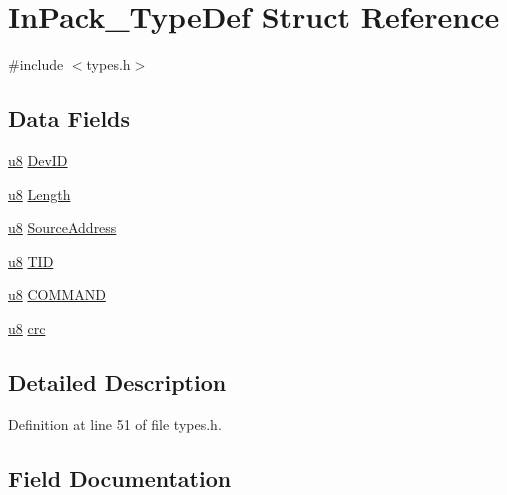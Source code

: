 \hypertarget{struct_in_pack___type_def}{}\section{In\+Pack\+\_\+\+Type\+Def Struct Reference}
\label{struct_in_pack___type_def}


{\ttfamily \#include $<$types.\+h$>$}

\subsection*{Data Fields}
\begin{DoxyCompactItemize}
\item 
\hyperlink{types_8h_aed742c436da53c1080638ce6ef7d13de}{u8} \hyperlink{struct_in_pack___type_def_a99d407767f1bfeb6b7e54c646df80472}{Dev\+I\+D}
\item 
\hyperlink{types_8h_aed742c436da53c1080638ce6ef7d13de}{u8} \hyperlink{struct_in_pack___type_def_ab74cd1c00143927f7c83f0c651dad173}{Length}
\item 
\hyperlink{types_8h_aed742c436da53c1080638ce6ef7d13de}{u8} \hyperlink{struct_in_pack___type_def_adf5bc4e40bad06fdd0c2b4e48f18831b}{Source\+Address}
\item 
\hyperlink{types_8h_aed742c436da53c1080638ce6ef7d13de}{u8} \hyperlink{struct_in_pack___type_def_ad1076cc9b9c0e86656584b48e443d884}{T\+I\+D}
\item 
\hyperlink{types_8h_aed742c436da53c1080638ce6ef7d13de}{u8} \hyperlink{struct_in_pack___type_def_ac58783f48ac7f67dcefd76e7a9c02de5}{C\+O\+M\+M\+A\+N\+D}
\item 
\hyperlink{types_8h_aed742c436da53c1080638ce6ef7d13de}{u8} \hyperlink{struct_in_pack___type_def_af3f2b259cd01019a9d79b1966a858470}{crc}
\end{DoxyCompactItemize}


\subsection{Detailed Description}


Definition at line 51 of file types.\+h.



\subsection{Field Documentation}
\hypertarget{struct_in_pack___type_def_ac58783f48ac7f67dcefd76e7a9c02de5}{}
